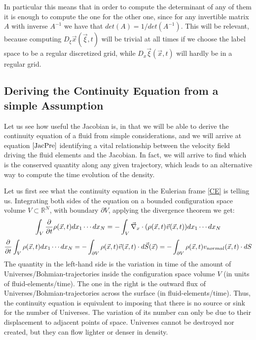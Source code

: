\documentclass[11pt, a4paper]{article} %
\newcommand{\R}{\mathbb{R}} %
\begin{document}
In particular this means that in order to compute the determinant of any of them it is enough to compute the one for the other one, since for any invertible matrix $A$ with inverse $A^{-1}$ we have that $det(A)=1/det(A^{-1})$. This will be relevant, because computing $D_\xi \vec{x}(\vec{\xi},t)$ will be trivial at all times if we choose the label space to be a regular discretized grid, while $D_x \vec{\xi}(\vec{x},t)$ will hardly be in a regular grid.

\subsection*{Deriving the Continuity Equation from a simple Assumption \vspace{-0.2cm} }
Let us see how useful the Jacobian is, in that we will be able to derive the continuity equation of a fluid from simple considerations, and we will arrive at equation $\eqref{JacPre}$ identifying a vital relationship between the velocity field driving the fluid elements and the Jacobian. In fact, we will arrive to find which is the conserved quantity along any given trajectory, which leads to an alternative way to compute the time evolution of the density.

Let us first see what the continuity equation in the Eulerian frame \eqref{CE} is telling us. Integrating both sides of the equation on a bounded configuration space volume $V\subset\R^N$, with boundary $\partial V$, applying the divergence theorem we get:
$$
\int_{V}\pdv{}{t} \rho(\vec{x},t) dx_1\cdots dx_N=-\int_{V}\vec{\nabla}_x\cdot \qty( \rho(\vec{x},t)\vec{v}(\vec{x},t) )dx_1\cdots dx_N
$$
\begin{equation}
\pdv{}{t} \int_{V} \rho(\vec{x},t) dx_1\cdots dx_N=-\int_{\partial V} \rho(\vec{x},t)\vec{v}(\vec{x},t)\cdot d\vec{S}(\vec{x})=-\int_{\partial V} \rho(\vec{x},t)v_{normal}(\vec{x},t)\cdot dS
\end{equation}
The quantity in the left-hand side is the variation in time of the amount of Universes/Bohmian-trajectories inside the configuration space volume $V$ (in units of fluid-elements/time). The one in the right is the outward flux of Universes/Bohmian-trajectories across the surface (in fluid-elements/time). Thus, the continuity equation is equivalent to imposing that there is no source or sink for the number of Universes. The variation of its number can only be due to their displacement to adjacent points of space. Universes cannot be destroyed nor created, but they can flow lighter or denser in density.
\end{document}
